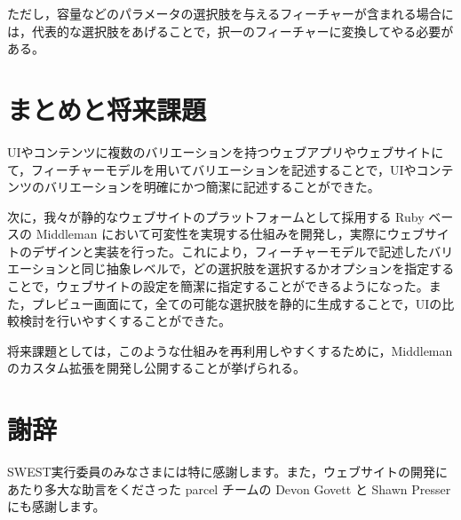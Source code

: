 \documentclass[submit,techrep]{ipsj}
\begin{document}
ただし，容量などのパラメータの選択肢を与えるフィーチャーが含まれる場合には，代表的な選択肢をあげることで，択一のフィーチャーに変換してやる必要がある。

\section{まとめと将来課題}

UIやコンテンツに複数のバリエーションを持つウェブアプリやウェブサイトにて，フィーチャーモデル\cite{FORM}を用いてバリエーションを記述することで，UIやコンテンツのバリエーションを明確にかつ簡潔に記述することができた。

次に，我々が静的なウェブサイトのプラットフォームとして採用する Ruby ベースの Middleman \cite{Middleman}において可変性を実現する仕組みを開発し，実際にウェブサイトのデザインと実装を行った。これにより，フィーチャーモデルで記述したバリエーションと同じ抽象レベルで，どの選択肢を選択するかオプションを指定することで，ウェブサイトの設定を簡潔に指定することができるようになった。また，プレビュー画面にて，全ての可能な選択肢を静的に生成することで，UIの比較検討を行いやすくすることができた。

将来課題としては，このような仕組みを再利用しやすくするために，Middleman のカスタム拡張\cite{Middleman}を開発し公開することが挙げられる。


\section*{謝辞}

SWEST実行委員のみなさまには特に感謝します。また，ウェブサイトの開発にあたり多大な助言をくださった parcel チームの Devon Govett と Shawn Presser にも感謝します。




\end{document}
